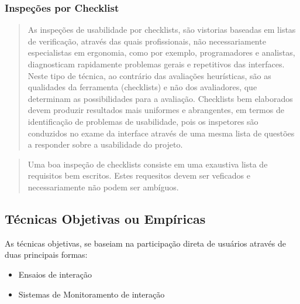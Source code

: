 \subsubsection{Inspeções por Checklist}

\begin{quote}
As inspeções de usabilidade por checklists, são vistorias baseadas em listas de verificação, através das quais profissionais, não necessariamente especialistas em ergonomia, como por exemplo, programadores e analistas, diagnosticam rapidamente problemas gerais e repetitivos das interfaces. Neste tipo de técnica, ao contrário das avaliações heurísticas, são as qualidades da ferramenta (checklists) e não dos avaliadores, que determinam as possibilidades para a avaliação. Checklists bem elaborados devem produzir resultados mais uniformes e abrangentes, em termos de identificação de problemas de usabilidade, pois os inspetores são conduzidos no exame da interface através de uma mesma lista de questões a responder sobre a usabilidade do projeto.
\cite{cybil_apostila}
\end{quote} 

\begin{quote}
Uma boa inspeção de checklists consiste em uma exaustiva lista de requisitos bem escritos. Estes requesitos devem ser veficados e necessariamente não podem ser ambíguos.
\cite{hci_design_usability}
\end{quote} 


\subsection{Técnicas Objetivas ou Empíricas}

As técnicas objetivas, se baseiam na participação direta de usuários através de duas principais formas:

\begin{itemize}
    \item Ensaios de interação
    \item Sistemas de Monitoramento de interação
\end{itemize}


